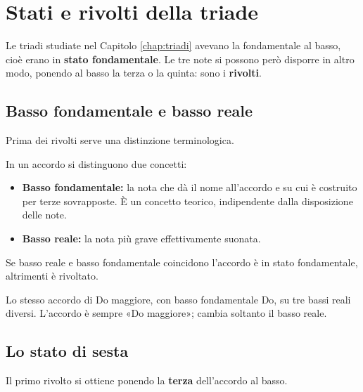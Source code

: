\chapter{Stati e rivolti della triade}
\label{chap:rivolti}

Le triadi studiate nel Capitolo \ref{chap:triadi} avevano la fondamentale al basso, cioè erano in \textbf{stato fondamentale}. Le tre note si possono però disporre in altro modo, ponendo al basso la terza o la quinta: sono i \textbf{rivolti}.

\section{Basso fondamentale e basso reale}
\label{subsec:basso_fondamentale_reale}

Prima dei rivolti serve una distinzione terminologica.

\begin{definizione}
	\label{def:basso_fondamentale_reale}
	In un accordo si distinguono due concetti:
	\begin{itemize}
		\item \textbf{Basso fondamentale:} la nota che dà il nome all'accordo e su cui è costruito per terze sovrapposte. È un concetto teorico, indipendente dalla disposizione delle note.
		\item \textbf{Basso reale:} la nota più grave effettivamente suonata.
	\end{itemize}
	Se basso reale e basso fondamentale coincidono l'accordo è in stato fondamentale, altrimenti è rivoltato.
\end{definizione}

\begin{esempio}
	\label{ex:basso_fond_reale}
	Lo stesso accordo di Do maggiore, con basso fondamentale Do, su tre bassi reali diversi.
	L'accordo è sempre «Do maggiore»; cambia soltanto il basso reale.
\end{esempio}

\section{Lo stato di sesta}
\label{subsec:primo_rivolto}

Il primo rivolto si ottiene ponendo la \textbf{terza} dell'accordo al basso.

